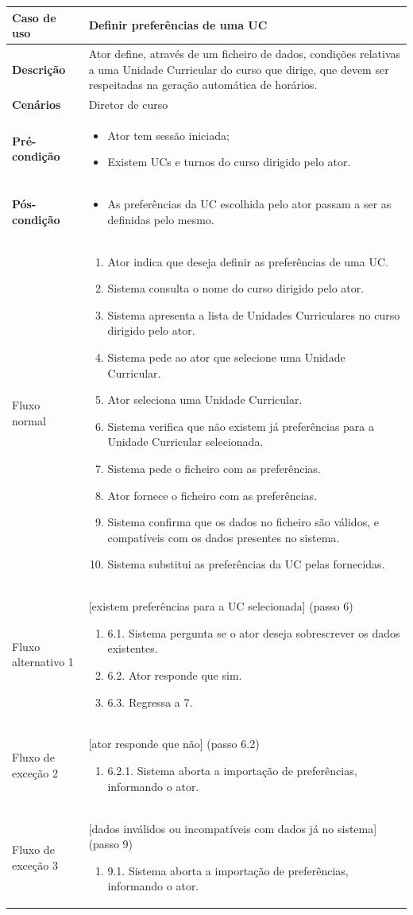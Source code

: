 \documentclass[12pt, a4paper]{article}
\newenvironment{condition}{
    \begin{itemize}[wide=0pt]
        \vspace{-0.2cm}
}{
        \vspace{-0.5cm}
    \end{itemize}
}
\newcommand\flow[1]{
    Fluxo normal &
    \singlespacing
    \begin{enumerate}[wide=0pt]
        #1
        \vspace{-0.3cm}
    \end{enumerate} \\ \hline
}
\newcommand\otherflow[3]{
    #1 &
    #2
    \singlespacing
    \begin{enumerate}[wide=0pt]
        #3
        \vspace{-0.3cm}
    \end{enumerate} \\ \hline
}
\newenvironment{usecase}[5]{
    \begin{table}[H]
        \centering
        \begin{tabular}{|>{\centering\arraybackslash\bf}m{3cm}|m{13cm}|}
            \hline
            Caso de uso & \textbf{#1} \\

            \hline
            Descrição & #2 \\

            \hline
            Cenários & #3 \\

            \hline
            Pré-condição &
            \begin{condition}
                #4
            \end{condition} \\

            \hline
            Pós-condição &
            \begin{condition}
                #5
            \end{condition} \\

            \hline
}{
    \end{tabular}
\end{table}
}
\begin{document}
\begin{usecase}
    {Definir preferências de uma UC}
    {
        Ator define, através de um ficheiro de dados, condições relativas a uma Unidade Curricular
        do curso que dirige, que devem ser respeitadas na geração automática de horários.
    }
    {Diretor de curso}
    {
        \item Ator tem sessão iniciada;
        \item Existem UCs e turnos do curso dirigido pelo ator.
    }
    {\item As preferências da UC escolhida pelo ator passam a ser as definidas pelo mesmo.}

    \flow{
        \item Ator indica que deseja definir as preferências de uma UC.
        \item Sistema consulta o nome do curso dirigido pelo ator.
        \item Sistema apresenta a lista de Unidades Curriculares no curso dirigido pelo ator.
        \item Sistema pede ao ator que selecione uma Unidade Curricular.
        \item Ator seleciona uma Unidade Curricular.
        \item Sistema verifica que não existem já preferências para a Unidade Curricular
            selecionada.
        \item Sistema pede o ficheiro com as preferências.
        \item Ator fornece o ficheiro com as preferências.
        \item Sistema confirma que os dados no ficheiro são válidos, e compatíveis com os dados
            presentes no sistema.
        \item Sistema substitui as preferências da UC pelas fornecidas.
    }

    \otherflow{Fluxo alternativo 1}{[existem preferências para a UC selecionada] (passo 6)}{
        \item[6.1.] Sistema pergunta se o ator deseja sobrescrever os dados existentes.
        \item[6.2.] Ator responde que sim.
        \item[6.3.] Regressa a 7.
    }

    \otherflow{Fluxo de exceção 2}{[ator responde que não] (passo 6.2)}{
        \item[6.2.1.] Sistema aborta a importação de preferências, informando o ator.
    }

    \otherflow{Fluxo de exceção 3}
        {[dados inválidos ou incompatíveis com dados já no sistema] (passo 9)}{

        \item[9.1.] Sistema aborta a importação de preferências, informando o ator.
    }
\end{usecase}
\end{document}
